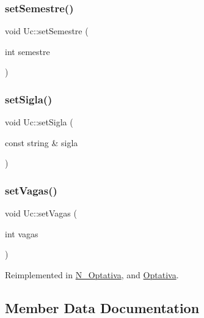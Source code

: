 \hypertarget{class_uc_a4185161e311af207eb39ce8ae8070f91}{}\label{class_uc_a4185161e311af207eb39ce8ae8070f91} 
\subsubsection{\texorpdfstring{set\+Semestre()}{setSemestre()}}
{\footnotesize\ttfamily void Uc\+::set\+Semestre (\begin{DoxyParamCaption}\item[{int}]{semestre }\end{DoxyParamCaption})}

\hypertarget{class_uc_aed13eb6a728b836ea6f50d9963220f8d}{}\label{class_uc_aed13eb6a728b836ea6f50d9963220f8d} 
\subsubsection{\texorpdfstring{set\+Sigla()}{setSigla()}}
{\footnotesize\ttfamily void Uc\+::set\+Sigla (\begin{DoxyParamCaption}\item[{const string \&}]{sigla }\end{DoxyParamCaption})}

\hypertarget{class_uc_a41b665e518e252eead3d8425696cddf3}{}\label{class_uc_a41b665e518e252eead3d8425696cddf3} 
\subsubsection{\texorpdfstring{set\+Vagas()}{setVagas()}}
{\footnotesize\ttfamily void Uc\+::set\+Vagas (\begin{DoxyParamCaption}\item[{int}]{vagas }\end{DoxyParamCaption})\hspace{0.3cm}{\ttfamily [virtual]}}



Reimplemented in \hyperlink{class_n___optativa_a07d95cc8ffddb4e5b6109dceb4647d0c}{N\+\_\+\+Optativa}, and \hyperlink{class_optativa_a5b123e4f96894d9ff8fb4e6f500ce40d}{Optativa}.



\subsection{Member Data Documentation}
\hypertarget{class_uc_a058e545b7e0dbbf16f6af64bb47361eb}{}\label{class_uc_a058e545b7e0dbbf16f6af64bb47361eb} 
